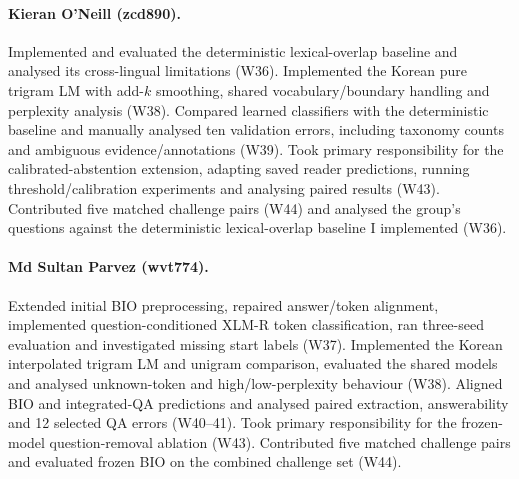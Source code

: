 \documentclass[11pt]{article}
\begin{document}
\paragraph{Kieran O'Neill (zcd890).}
Implemented and evaluated the deterministic lexical-overlap baseline and analysed its cross-lingual limitations (W36). Implemented the Korean pure trigram LM with add-$k$ smoothing, shared vocabulary/boundary handling and perplexity analysis (W38). Compared learned classifiers with the deterministic baseline and manually analysed ten validation errors, including taxonomy counts and ambiguous evidence/annotations (W39). Took primary responsibility for the calibrated-abstention extension, adapting saved reader predictions, running threshold/calibration experiments and analysing paired results (W43). Contributed five matched challenge pairs (W44) and analysed the group's questions against the deterministic lexical-overlap baseline I implemented (W36).

\paragraph{Md Sultan Parvez (wvt774).}
Extended initial BIO preprocessing, repaired answer/token alignment, implemented question-conditioned XLM-R token classification, ran three-seed evaluation and investigated missing start labels (W37). Implemented the Korean interpolated trigram LM and unigram comparison, evaluated the shared models and analysed unknown-token and high/low-perplexity behaviour (W38). Aligned BIO and integrated-QA predictions and analysed paired extraction, answerability and 12 selected QA errors (W40--41). Took primary responsibility for the frozen-model question-removal ablation (W43). Contributed five matched challenge pairs and evaluated frozen BIO on the combined challenge set (W44).
\end{document}
